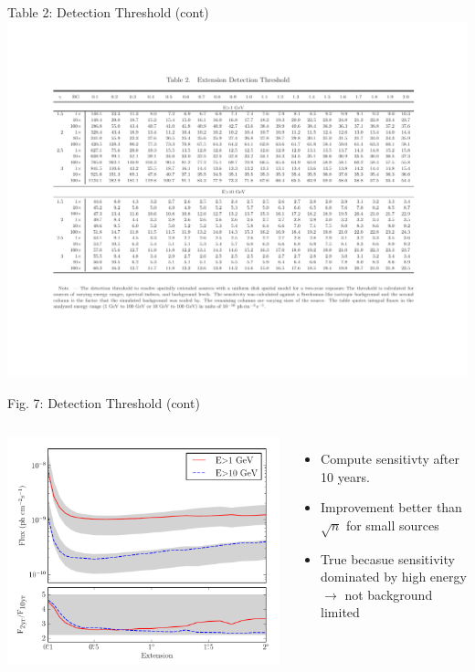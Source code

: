 \documentclass[12pt]{beamer}
\begin{document}
\begin{frame}{Table 2: Detection Threshold (cont)}
  \includegraphics[scale=0.5]{plots/threshold_table.pdf}
\end{frame}

\begin{frame}{Fig. 7: Detection Threshold (cont)}
  \begin{columns}
    \includegraphics[scale=0.50]{plots/time_sensitivity_color.pdf}
    \begin{itemize}
      \item Compute sensitivty after 10 years.
      \item Improvement better than $\sqrt{n}$ for
      small sources
      \item True becasue sensitivity dominated by
      high energy $\rightarrow$ not background limited
    \end{itemize}
  \end{columns}
\end{frame}
\end{document}
